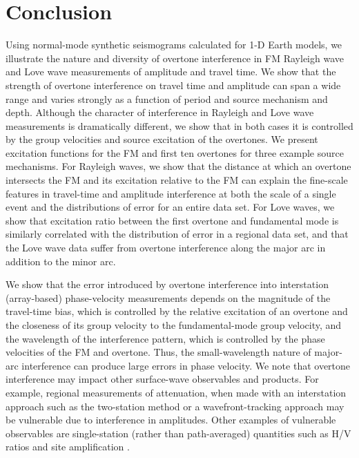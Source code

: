 \documentclass[extra,mreferee]{gji}
\begin{document}
\section{Conclusion}
Using normal-mode synthetic seismograms calculated for 1-D Earth models, we illustrate the nature and diversity of overtone interference in FM Rayleigh wave and Love wave measurements of amplitude and travel time. We show that the strength of overtone interference on travel time and amplitude can span a wide range and varies strongly as a function of period and source mechanism and depth. Although the character of interference in Rayleigh and Love wave measurements is dramatically different, we show that in both cases it is controlled by the group velocities and source excitation of the overtones. We present excitation functions for the FM and first ten overtones for three example source mechanisms. For Rayleigh waves, we show that the distance at which an overtone intersects the FM and its excitation relative to the FM can explain the fine-scale features in travel-time and amplitude interference at both the scale of a single event and the distributions of error for an entire data set. For Love waves, we show that excitation ratio between the first overtone and fundamental mode is similarly correlated with the distribution of error in a regional data set, and that the Love wave data suffer from overtone interference along the major arc in addition to the minor arc.

We show that the error introduced by overtone interference into interstation (array-based) phase-velocity measurements depends on the magnitude of the travel-time bias, which is controlled by the relative excitation of an overtone and the closeness of its group velocity to the fundamental-mode group velocity, and the wavelength of the interference pattern, which is controlled by the phase velocities of the FM and overtone. Thus, the small-wavelength nature of major-arc interference can produce large errors in phase velocity. We note that overtone interference may impact other surface-wave observables and products. For example, regional measurements of attenuation, when made with an interstation approach such as the two-station method \citep{zhou2020rayleigh} or a wavefront-tracking approach \citep{xbaoattenuationsurfacewaves} may be vulnerable due to interference in amplitudes. Other examples of vulnerable observables are single-station (rather than path-averaged) quantities such as H/V ratios \citep{tanimoto2008zh} and site amplification \citep{eddy2014local,schardong2019anatomy}. 
\end{document}
